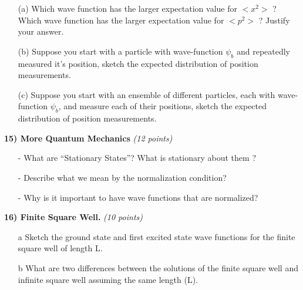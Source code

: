 {\begin{minipage}{\textwidth}
\begin{itemize}
{\begin{itemize}
\item[(a)]
Which wave function has the larger expectation value for $<x^2>$ ?
Which wave function has the larger expectation value for $<p^2>$ ? Justify your answer.
\vspace*{1.5in}
\item[(b)]
Suppose you start with a particle with wave-function $\psi_b$ and repeatedly measured it's position,
sketch the expected distribution of position measurements. 
\vspace*{1.5in}
\item[(c)]
Suppose you start with an ensemble of different particles, each with wave-function $\psi_b$, and measure each of their positions,
sketch the expected distribution of position measurements. 
\vspace*{1.5in}
\end{itemize}
}
\end{itemize}
\end{minipage}

\vspace{0.25in}

\begin{minipage}{\textwidth}
\textbf{15) More Quantum Mechanics} \hfill \textit{(12 points)}
\begin{itemize}
\item[-] What are ``Stationary States''? What is stationary about them ?
\vspace*{1.in}
\item[-] Describe what we mean by the normalization condition? 
\vspace*{1.in}
\item[-] Why is it important to have wave functions that are normalized?
\vspace*{1.in}
\end{itemize}
\end{minipage}


\begin{minipage}{\textwidth}
\textbf{16) Finite Square Well. } \hfill \textit{(10 points)}
\begin{itemize}
\item[a] Sketch the ground state and first excited state wave functions for the finite square well of length L.
\vspace*{1.5in}
\item[b] What are two differences between the solutions of the finite square well and infinite square well assuming the same length (L).
\end{itemize}
\end{minipage}


}
